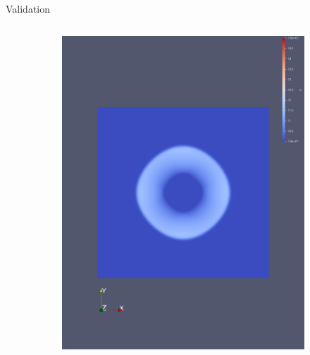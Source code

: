 \documentclass[
  english,            %
  aspectratio=169,    %
  11pt
]{tumbeamer}
\begin{document}
\begin{frame}{Validation}
\begin{columns}
	\begin{column}{.45\textwidth}
		 \begin{figure}[htpb]
			\centering
			\begin{subfigure}{.48\textwidth}
				\includegraphics[width=\textwidth,keepaspectratio=true]{figs/1_validation_cuda_original_1mpi.png}
				\label{fig:1mpi_2nd}
			\end{subfigure}
			\begin{subfigure}{.48\textwidth}
				\centering

\end{subfigure}
\end{figure}
\end{column}
\end{columns}
\end{frame}
\end{document}
